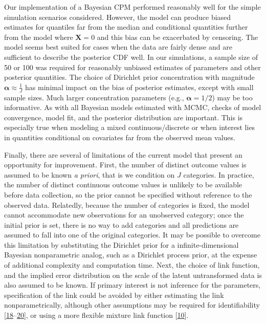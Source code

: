 \documentclass[
]{article}
\begin{document}
Our implementation of a Bayesian CPM performed reasonably well for the simple simulation scenarios considered. However, the model can produce biased estimates
for quantiles far from the median and conditional quantities further from the model where \(\boldsymbol{X}=0\) and this bias can be exacerbated by censoring.
The model seems best suited for cases when the data are fairly dense and are sufficient to describe the posterior CDF well. In our simulations, a sample size of 50 or 100 was required for reasonably unbiased estimates of parameters and other posterior quantities. The choice of Dirichlet prior concentration with magnitude \(\boldsymbol{\alpha} \approx \frac{1}{J}\) has minimal impact on the bias of posterior estimates, except with small sample sizes. Much larger concentration parameters (e.g., \(\boldsymbol{\alpha}=1/2\)) may be too informative. As with all Bayesian models estimated with MCMC, checks of model convergence, model fit, and the posterior distribution are important. This is especially true when modeling a mixed continuous/discrete or when interest lies in quantities conditional on covariates far from the observed mean values.

Finally, there are several of limitations of the current model that present an opportunity for improvement. First, the number of distinct outcome values is assumed to be known \emph{a priori}, that is we condition on \(J\) categories. In practice, the number of distinct continuous outcome values is unlikely to be available before data collection, so the prior cannot be specified without reference to the observed data. Relatedly, because the number of categories is fixed, the model cannot accommodate new observations for an unobserved category; once the initial prior is set, there is no way to add categories and all predictions are assumed to fall into one of the original categories. It may be possible to overcome this limitation by substituting the Dirichlet prior for a infinite-dimensional Bayesian nonparametric analog, such as a Dirichlet process prior, at the expense of additional complexity and computation time. Next, the choice of link function, and the implied error distribution on the scale of the latent untransformed data is also assumed to be known. If primary interest is not inference for the parameters, specification of the link could be avoided by either estimating the link nonparametrically, although other assumptions may be required for identifiability {{[}\protect\hyperlink{ref-song_semiparametric_2012}{18}--\protect\hyperlink{ref-mallick_bayesian_2003}{20}{]}}, or using a more flexible mixture link function {{[}\protect\hyperlink{ref-lang_bayesian_1999}{10}{]}}.
\end{document}
